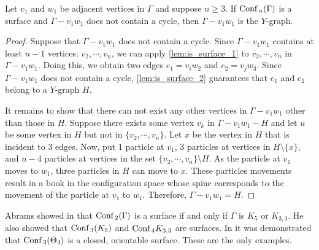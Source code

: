 \begin{lem}
Let \(v_1\) and \(w_1\) be adjacent vertices in \(\Gamma\) and suppose \(n \ge 3\).
If \(\text{Conf}\,_n(\Gamma)\) is a surface and \(\Gamma - v_1 w_1\) does not contain a cycle, then \(\Gamma - v_1 w_1\) is the \(Y\)-graph.
\end{lem}
\begin{proof}
Suppose that \(\Gamma - v_1 w_1\) does not contain a cycle.
Since \(\Gamma - v_1 w_1\) contains at least \(n - 1\) vertices: \(v_2, \cdots, v_n\), 
we can apply \ref{lem:is_surface_1} to \(v_2, \cdots, v_n\) in \(\Gamma - v_1 w_1\).
Doing this, we obtain two edges \(e_1 = v_i w_2\) and \(e_2 = v_j w_3\).
Since \(\Gamma - v_1 w_1\) does not contain a cycle, \ref{lem:is_surface_2} guarantees that
\(e_1\) and \(e_2\) belong to a \(Y\)-graph \(H\).

It remains to show that there can not exist any other vertices in \(\Gamma - v_1 w_1\) other than those in \(H\).
Suppose there exists some vertex \(v_k\) in \(\Gamma - v_1 w_1 - H\) and let \(u\) be some vertex in \(H\) but not in \(\{v_2, \cdots, v_n\}\).
Let \(x\) be the vertex in \(H\) that is incident to \(3\) edges.
Now, put 1 particle at \(v_1\), \(3\) particles at vertices in \(H \setminus \{x\}\),
and \(n-4\) particles at vertices in the set \(\{v_2, \cdots, v_n\}\setminus H\).
As the particle at \(v_1\) moves to \(w_1\),
three particles in \(H\) can move to \(x\).
These particles movements result in a book in the configuration space whose spine
corresponds to the movement of the particle at \(v_1\) to \(w_1\).
Therefore, \(\Gamma - v_1 w_1 = H\).
\end{proof}

Abrams showed in \cite{abrams2000configurationspaces} that \(\text{Conf}\,_2(\Gamma)\) is a surface if and only if \(\Gamma\) is \(K_5\) or \(K_{3,3}\).
He also showed that \(\text{Conf}\,_3(K_5)\) and \(\text{Conf}\,_4{K_{3,3}}\) are surfaces.
In \cite{appiah2024algebraicstructurehyperbolicgraph} it was demonstrated that \(\text{Conf}\,_3(\Theta_4)\) is a closed, orientable surface.
These are the only examples.

